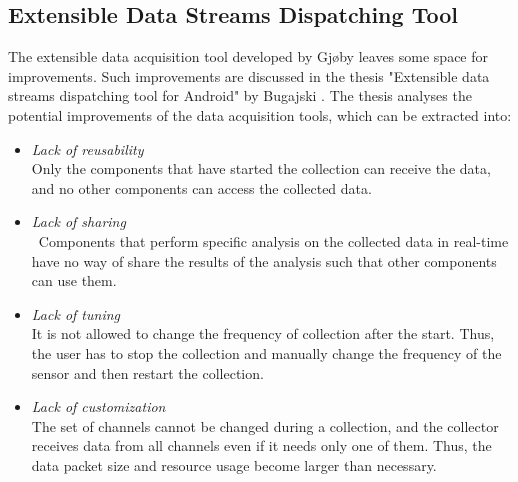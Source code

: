 \subsection{Extensible Data Streams Dispatching Tool}\label{background:daniel}
The extensible data acquisition tool developed by Gjøby \cite{gjoby} leaves some space for improvements. Such improvements are discussed in the thesis "Extensible data streams dispatching tool for Android" by Bugajski \cite{daniel}. The thesis analyses the potential improvements of the data acquisition tools, which can be extracted into:
\begin{itemize}
    \item \textit{Lack of reusability} \\ Only the components that have started the collection can receive the data, and no other components can access the collected data.
    \item \textit{Lack of sharing} \\ Components that perform specific analysis on the collected data in real-time have no way of share the results of the analysis such that other components can use them. 
    \item \textit{Lack of tuning} \\ It is not allowed to change the frequency of collection after the start. Thus, the user has to stop the collection and manually change the frequency of the sensor and then restart the collection. 
    \item \textit{Lack of customization} \\ The set of channels cannot be changed during a collection, and the collector receives data from all channels even if it needs only one of them. Thus, the data packet size and resource usage become larger than necessary.
\end{itemize}

